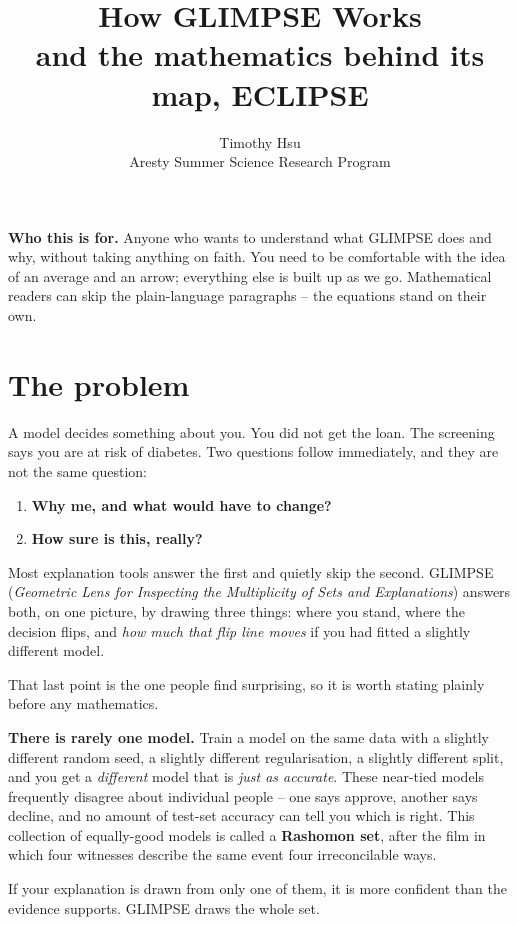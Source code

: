 \documentclass[11pt]{article}
\title{\bfseries How GLIMPSE Works\\[4pt]
\large and the mathematics behind its map, ECLIPSE}
\author{Timothy Hsu \\ \small Aresty Summer Science Research Program}
\date{}
\begin{document}
\maketitle

\begin{keybox}
\textbf{Who this is for.} Anyone who wants to understand what GLIMPSE does and why,
without taking anything on faith. You need to be comfortable with the idea of an
average and an arrow; everything else is built up as we go. Mathematical readers can
skip the plain-language paragraphs -- the equations stand on their own.
\end{keybox}

\section{The problem}

A model decides something about you. You did not get the loan. The screening says you
are at risk of diabetes. Two questions follow immediately, and they are not the same
question:

\begin{enumerate}[leftmargin=*, itemsep=2pt]
  \item \textbf{Why me, and what would have to change?}
  \item \textbf{How sure is this, really?}
\end{enumerate}

Most explanation tools answer the first and quietly skip the second. GLIMPSE
(\emph{Geometric Lens for Inspecting the Multiplicity of Sets and Explanations})
answers both, on one picture, by drawing three things: where you stand, where the
decision flips, and \emph{how much that flip line moves} if you had fitted a slightly
different model.

That last point is the one people find surprising, so it is worth stating plainly
before any mathematics.

\begin{keybox}
\textbf{There is rarely one model.} Train a model on the same data with a slightly
different random seed, a slightly different regularisation, a slightly different
split, and you get a \emph{different} model that is \emph{just as accurate}. These
near-tied models frequently disagree about individual people -- one says approve,
another says decline, and no amount of test-set accuracy can tell you which is right.
This collection of equally-good models is called a \textbf{Rashomon set}, after the
film in which four witnesses describe the same event four irreconcilable ways.

If your explanation is drawn from only one of them, it is more confident than the
evidence supports. GLIMPSE draws the whole set.
\end{keybox}
\end{document}
